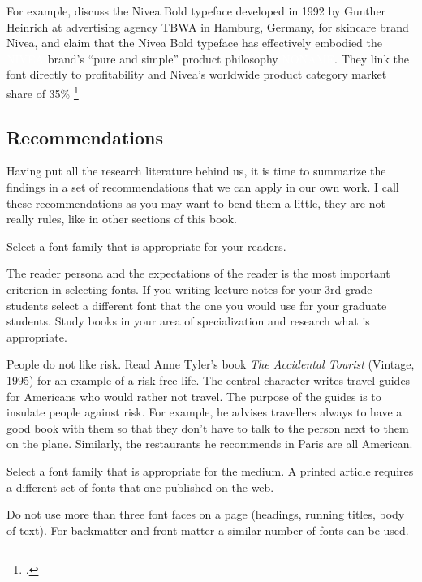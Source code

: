For example, \citeauthor{rogener1995} discuss the Nivea
Bold typeface developed in 1992 by Gunther
Heinrich at advertising agency \textsc{TBWA} in
Hamburg, Germany, for skincare brand Nivea,
and claim that the Nivea Bold typeface has
effectively embodied the {\fboxsep=2pt \nivea \colorbox{blue700}{\textcolor{white}{NIVEA}}} brand’s \enquote{pure and simple} product philosophy {\fboxsep=2pt\nivea \colorbox{blue700}{\textcolor{white}{NONAME}}}. They link the font directly to profitability and Nivea’s worldwide 
product category market share of 35\% \footcite[p. 91]{rogener1995} 

\subsection*{Recommendations}

Having put all the research literature behind us, it is time to summarize the findings in a set of recommendations that we can apply in our own work. I call these recommendations as you may want to bend them a little, they are not really rules, like in other sections of this book. 

\begin{Rule}
Select a font family that is appropriate for your readers.
\end{Rule}

The reader persona and the expectations of the reader is the most important criterion in selecting fonts.
If you writing lecture notes for your 3rd grade students select a different font that the one you would use
for your graduate students. Study books in your area of specialization and research what is appropriate.

People do not like risk. Read Anne Tyler’s book \textit{The Accidental Tourist} (Vintage, 1995) for an example of
a risk-free life. The central character writes travel guides for Americans who
would rather not travel. The purpose of the guides is to insulate people against
risk. For example, he advises travellers always to have a good book with them
so that they don’t have to talk to the person next to them on the plane.
Similarly, the restaurants he recommends in Paris are all American.

\begin{Rule}
Select a font family that is appropriate for the medium. A printed article requires a different set of
fonts that one published on the web.
\end{Rule}

\begin{Rule}
Do not use more than three font faces on a page (headings, running titles, body of text). For backmatter and front matter a similar number of fonts can be used.
\end{Rule}

